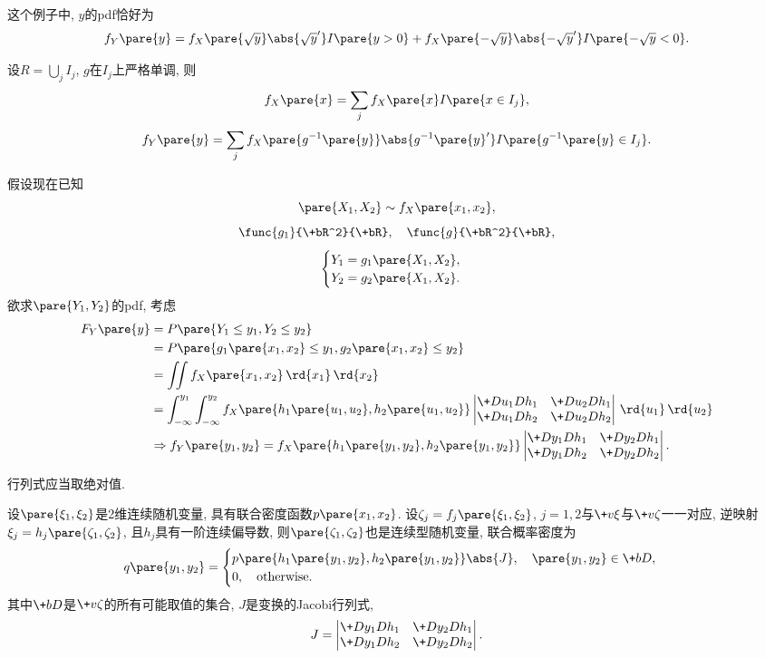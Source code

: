 \documentclass[../Statistics.tex]{subfiles}
\begin{document}
这个例子中, $y$的pdf恰好为
\[ f_Y\pare{y} = f_X\pare{\sqrt{y}}\abs{\sqrt{y}'}I\pare{y>0} + f_X\pare{-\sqrt{y}}\abs{-\sqrt{y}'}I\pare{-\sqrt{y} < 0}. \]
\begin{theorem}
    设$R = \bigcup_j I_j$, $g$在$I_j$上严格单调, 则
    \[ f_X\pare{x} = \sum_j f_X\pare{x} I\pare{x\in I_j}, \]
    \[ f_Y\pare{y} = \sum_j f_X\pare{g^{-1}\pare{y}}\abs{g^{-1}\pare{y}'}I\pare{g^{-1}\pare{y}\in I_j}. \]
\end{theorem}
假设现在已知
\[ \pare{X_1,X_2}\sim f_X\pare{x_1,x_2}, \]
\[ \func{g_1}{\+bR^2}{\+bR},\quad \func{g}{\+bR^2}{\+bR}, \]
\[ \begin{cases}
    Y_1 = g_1\pare{X_1,X_2}, \\
    Y_2 = g_2\pare{X_1,X_2}.
\end{cases} \]
欲求$\pare{Y_1,Y_2}$的pdf, 考虑
\begin{align*}
    F_Y\pare{y} &= P\pare{Y_1 \le y_1, Y_2 \le y_2} \\
    &= P\pare{g_1\pare{x_1,x_2}\le y_1, g_2\pare{x_1,x_2}\le y_2} \\
    &= \iint f_X\pare{x_1,x_2}\,\rd{x_1}\,\rd{x_2} \\
    &= \int_{-\infty}^{y_1}\int_{-\infty}^{y_2} f_X\pare{h_1\pare{u_1,u_2},h_2\pare{u_1,u_2}} \begin{vmatrix}
        \+D{u_1}D{h_1} & \+D{u_2}D{h_1} \\
        \+D{u_1}D{h_2} & \+D{u_2}D{h_2} 
    \end{vmatrix}\,\rd{u_1}\,\rd{u_2} \\
    &\Rightarrow f_Y\pare{y_1,y_2} = f_X\pare{h_1\pare{y_1,y_2},h_2\pare{y_1,y_2}} \begin{vmatrix}
        \+D{y_1}D{h_1} & \+D{y_2}D{h_1} \\
        \+D{y_1}D{h_2} & \+D{y_2}D{h_2} 
    \end{vmatrix}.
\end{align*}
\begin{remark}
    行列式应当取绝对值.
\end{remark}
\begin{theorem}
    设$\pare{\xi_1,\xi_2}$是2维连续随机变量, 具有联合密度函数$p\pare{x_1,x_2}$. 设$\zeta_j = f_j\pare{\xi_1,\xi_2}$, $j=1,2$与$\+v\xi$与$\+v\zeta$一一对应, 逆映射$\xi_j = h_j\pare{\zeta_1,\zeta_2}$, 且$h_j$具有一阶连续偏导数, 则$\pare{\zeta_1,\zeta_2}$也是连续型随机变量, 联合概率密度为
    \[ q\pare{y_1,y_2} = \begin{cases}
        p\pare{h_1\pare{y_1,y_2},h_2\pare{y_1,y_2}}\abs{J},\quad \pare{y_1,y_2}\in \+bD, \\
        0,\quad \mathrm{otherwise}. \\
    \end{cases} \]
    其中$\+bD$是$\+v\zeta$的所有可能取值的集合, $J$是变换的Jacobi行列式,
    \[ J = \begin{vmatrix}
        \+D{y_1}D{h_1} & \+D{y_2}D{h_1} \\
        \+D{y_1}D{h_2} & \+D{y_2}D{h_2} 
    \end{vmatrix}. \]
\end{theorem}
\end{document}
